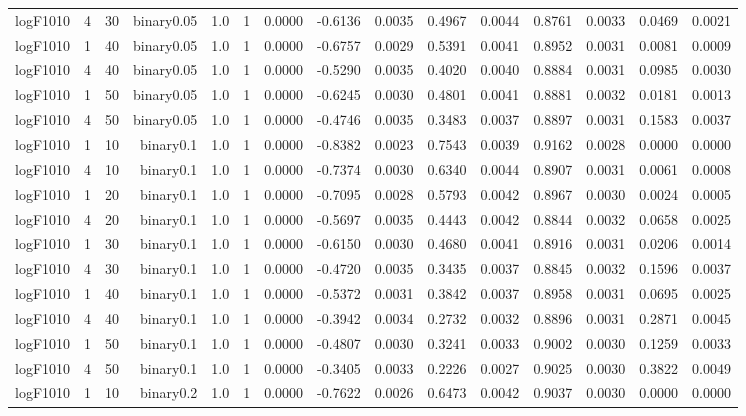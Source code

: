 \begin{longtable}{rrrrrrrrrrrrrrr}
  logF1010 & 4 & 30 & binary0.05 & 1.0 & 1 & 0.0000 & -0.6136 & 0.0035 & 0.4967 & 0.0044 & 0.8761 & 0.0033 & 0.0469 & 0.0021 \\ 
  logF1010 & 1 & 40 & binary0.05 & 1.0 & 1 & 0.0000 & -0.6757 & 0.0029 & 0.5391 & 0.0041 & 0.8952 & 0.0031 & 0.0081 & 0.0009 \\ 
  logF1010 & 4 & 40 & binary0.05 & 1.0 & 1 & 0.0000 & -0.5290 & 0.0035 & 0.4020 & 0.0040 & 0.8884 & 0.0031 & 0.0985 & 0.0030 \\ 
  logF1010 & 1 & 50 & binary0.05 & 1.0 & 1 & 0.0000 & -0.6245 & 0.0030 & 0.4801 & 0.0041 & 0.8881 & 0.0032 & 0.0181 & 0.0013 \\ 
  logF1010 & 4 & 50 & binary0.05 & 1.0 & 1 & 0.0000 & -0.4746 & 0.0035 & 0.3483 & 0.0037 & 0.8897 & 0.0031 & 0.1583 & 0.0037 \\ 
  logF1010 & 1 & 10 & binary0.1 & 1.0 & 1 & 0.0000 & -0.8382 & 0.0023 & 0.7543 & 0.0039 & 0.9162 & 0.0028 & 0.0000 & 0.0000 \\ 
  logF1010 & 4 & 10 & binary0.1 & 1.0 & 1 & 0.0000 & -0.7374 & 0.0030 & 0.6340 & 0.0044 & 0.8907 & 0.0031 & 0.0061 & 0.0008 \\ 
  logF1010 & 1 & 20 & binary0.1 & 1.0 & 1 & 0.0000 & -0.7095 & 0.0028 & 0.5793 & 0.0042 & 0.8967 & 0.0030 & 0.0024 & 0.0005 \\ 
  logF1010 & 4 & 20 & binary0.1 & 1.0 & 1 & 0.0000 & -0.5697 & 0.0035 & 0.4443 & 0.0042 & 0.8844 & 0.0032 & 0.0658 & 0.0025 \\ 
  logF1010 & 1 & 30 & binary0.1 & 1.0 & 1 & 0.0000 & -0.6150 & 0.0030 & 0.4680 & 0.0041 & 0.8916 & 0.0031 & 0.0206 & 0.0014 \\ 
  logF1010 & 4 & 30 & binary0.1 & 1.0 & 1 & 0.0000 & -0.4720 & 0.0035 & 0.3435 & 0.0037 & 0.8845 & 0.0032 & 0.1596 & 0.0037 \\ 
  logF1010 & 1 & 40 & binary0.1 & 1.0 & 1 & 0.0000 & -0.5372 & 0.0031 & 0.3842 & 0.0037 & 0.8958 & 0.0031 & 0.0695 & 0.0025 \\ 
  logF1010 & 4 & 40 & binary0.1 & 1.0 & 1 & 0.0000 & -0.3942 & 0.0034 & 0.2732 & 0.0032 & 0.8896 & 0.0031 & 0.2871 & 0.0045 \\ 
  logF1010 & 1 & 50 & binary0.1 & 1.0 & 1 & 0.0000 & -0.4807 & 0.0030 & 0.3241 & 0.0033 & 0.9002 & 0.0030 & 0.1259 & 0.0033 \\ 
  logF1010 & 4 & 50 & binary0.1 & 1.0 & 1 & 0.0000 & -0.3405 & 0.0033 & 0.2226 & 0.0027 & 0.9025 & 0.0030 & 0.3822 & 0.0049 \\ 
  logF1010 & 1 & 10 & binary0.2 & 1.0 & 1 & 0.0000 & -0.7622 & 0.0026 & 0.6473 & 0.0042 & 0.9037 & 0.0030 & 0.0000 & 0.0000 \\ 

\end{longtable}
